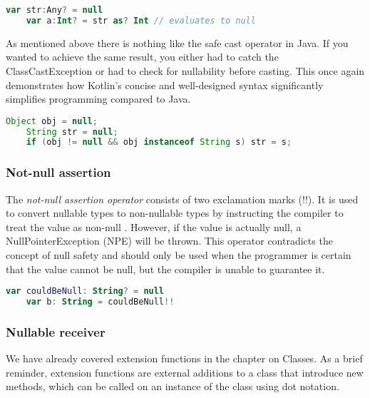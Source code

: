 \documentclass[a4paper, 11pt]{article}
\begin{document}
  \begin{lstlisting}[language=Kotlin,title={Usage of the safe cast operator on a nullable value}]
    var str:Any? = null
    var a:Int? = str as? Int // evaluates to null
  \end{lstlisting}
  As mentioned above there is nothing like the safe cast operator in Java. If you wanted to achieve the same result, you either had to catch the ClassCastException or  had to check for nullability before casting. This once again demonstrates how Kotlin's concise and well-designed syntax significantly simplifies programming compared to Java.
  \begin{lstlisting}[language=Java,title={Functionality of safe call operator in java}]
    Object obj = null;
    String str = null;
    if (obj != null && obj instanceof String s) str = s;
  \end{lstlisting}

  \subsubsection{Not-null assertion}
    The \textit{not-null assertion operator} consists of two exclamation marks (!!). It is used to convert nullable types to non-nullable types by instructing the compiler to treat the value as non-null \cite{nullsafety-assertion}. However, if the value is actually null, a NullPointerException (NPE) will be thrown. This operator contradicts the concept of null safety and should only be used when the programmer is certain that the value cannot be null, but the compiler is unable to guarantee it.
  \begin{lstlisting}[language=Kotlin,title={Usage of the not-null assertion}]
    var couldBeNull: String? = null
    var b: String = couldBeNull!!
  \end{lstlisting}

  \subsubsection{Nullable receiver}
    We have already covered extension functions in the chapter on Classes. As a brief reminder, extension functions are external additions to a class that introduce new methods, which can be called on an instance of the class using dot notation.
\end{document}
